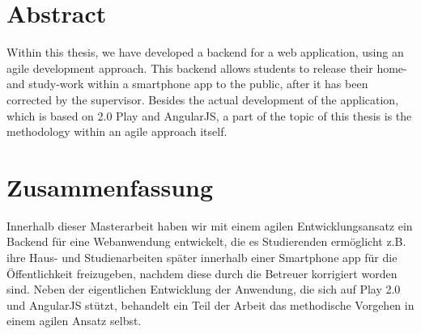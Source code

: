 \begingroup
\let\clearpage\relax
\let\cleardoublepage\relax
\let\cleardoublepage\relax

\chapter*{Abstract}
Within this thesis, we have developed a backend for a web application, using an agile development approach. This backend allows students to release their home- and study-work within a smartphone app to the public, after it has been corrected by the supervisor.
Besides the actual development of the application, which is based on 2.0 Play and AngularJS, a part of the topic of this thesis is the methodology within an agile approach itself.

\vfill

\chapter*{Zusammenfassung}
Innerhalb dieser Masterarbeit haben wir mit einem agilen Entwicklungsansatz ein Backend f\"ur eine Webanwendung entwickelt, die es Studierenden erm\"oglicht z.B. ihre Haus- und Studienarbeiten sp\"ater innerhalb einer Smartphone app f\"ur die \"Offentlichkeit freizugeben, nachdem diese durch die Betreuer korrigiert worden sind.   
Neben der eigentlichen Entwicklung der Anwendung, die sich auf Play 2.0 und AngularJS st\"utzt, behandelt ein Teil der Arbeit das methodische Vorgehen in einem agilen Ansatz selbst. 
\endgroup			

\vfill